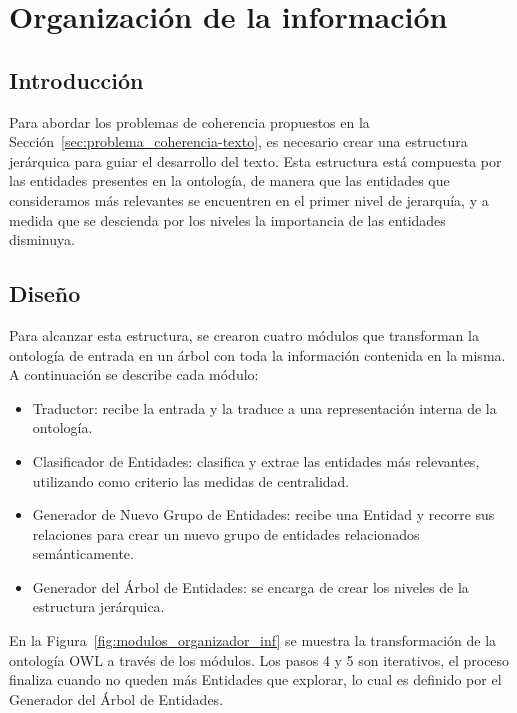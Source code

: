 \chapter{Organización de la información}

\section{Introducción}
Para abordar los problemas de coherencia propuestos en la Sección~\ref{sec:problema_coherencia-texto}, es necesario crear una estructura jerárquica para guiar el desarrollo del texto. Esta estructura está compuesta por las entidades presentes en la ontología, de manera que las entidades que consideramos más relevantes se encuentren en el primer nivel de jerarquía, y a medida que se descienda por los niveles la importancia de las entidades disminuya.

\section{Diseño}
Para alcanzar esta estructura, se crearon cuatro módulos que transforman la ontología de entrada en un árbol con toda la información contenida en la misma.
A continuación se describe cada módulo:
\begin{itemize}
    \item Traductor: recibe la entrada y la traduce a una representación interna de la ontología.
    \item Clasificador de Entidades: clasifica y extrae las entidades más relevantes, utilizando como criterio las medidas de centralidad.
    \item Generador de Nuevo Grupo de Entidades: recibe una Entidad y recorre sus relaciones para crear un nuevo grupo de entidades relacionados semánticamente.
    \item Generador del Árbol de Entidades: se encarga de crear los niveles de la estructura jerárquica.
    
\end{itemize}

En la Figura~\ref{fig:modulos_organizador_inf} se muestra la transformación de la ontología OWL a través de los módulos. Los pasos 4 y 5 son iterativos, el proceso finaliza cuando no queden más Entidades que explorar, lo cual es definido por el Generador del Árbol de Entidades.


